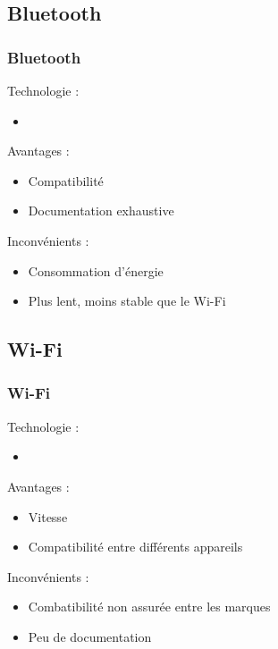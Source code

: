 \documentclass{beamer}
\begin{document}
      \subsection{Bluetooth}
      \begin{frame}
	  \frametitle{Bluetooth}
	  \begin{block}{Technologie :}
	  \begin{itemize}
	   \item 
	  \end{itemize}
	  \end{block}
	  \begin{block}{Avantages :}
	  \begin{itemize}
	   \item Compatibilité
	   \item Documentation exhaustive
	  \end{itemize}
	  \end{block}
	  \begin{block}{Inconvénients :}
	  \begin{itemize}
	   \item Consommation d'énergie
	   \item Plus lent, moins stable que le Wi-Fi
	  \end{itemize}
	  \end{block}
      \end{frame}
      \subsection{Wi-Fi}
      \begin{frame}
	  \frametitle{Wi-Fi}
	  \begin{block}{Technologie :}
	  \begin{itemize}
	   \item 
	  \end{itemize}
	  \end{block}
	  \begin{block}{Avantages :}
	  \begin{itemize}
	   \item Vitesse
	   \item Compatibilité entre différents appareils
	  \end{itemize}
	  \end{block}
	  \begin{block}{Inconvénients :}
	  \begin{itemize}
	   \item Combatibilité non assurée entre les marques
	   \item Peu de documentation
	  \end{itemize}
	  \end{block}
      \end{frame}
\end{document}
